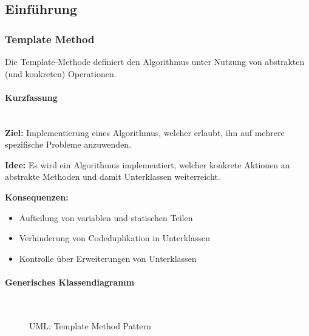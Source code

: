 \documentclass[
    ngerman,
    color=3b,
    summary,
    boxarc,
    main,
]{rubos-tuda-template}
\begin{document}
\subsection{Einführung}


\subsubsection{Template Method}
\begin{definition}
    Die Template-Methode definiert den Algorithmus unter Nutzung von abstrakten (und konkreten) Operationen.
\end{definition}
\paragraph{Kurzfassung}\mbox{}\\
\textbf{Ziel:} Implementierung eines Algorithmus, welcher erlaubt, ihn auf mehrere spezifische Probleme anzuwenden.

\textbf{Idee:} Es wird ein Algorithmus implementiert, welcher konkrete Aktionen an abstrakte Methoden und damit Unterklassen weiterreicht.

\textbf{Konsequenzen:}
\begin{itemize}
    \item Aufteilung von variablen und statischen Teilen
    \item Verhinderung von Codeduplikation in Unterklassen
    \item Kontrolle über Erweiterungen von Unterklassen
\end{itemize}

\paragraph{Generisches Klassendiagramm}\mbox{}\\
\begin{figure}[ht]
    \centering
    \caption{UML: Template Method Pattern}
\end{figure}
\end{document}

